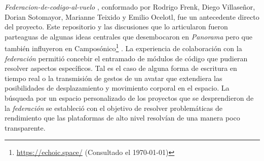 \textit{Federacion-de-codigo-al-vuelo} \citep{en-vivo}, conformado por Rodrigo Frenk, Diego Villaseñor, Dorian Sotomayor, Marianne Teixido y Emilio Ocelotl, fue un antecedente directo del proyecto. Este repositorio y las discusiones que lo articularon fueron parteaguas de algunas ideas centrales que desembocaron en \textit{Panorama} pero que también influyeron en Camposónico\footnote{\url{https://echoic.space/} (Consultado el \today)} \citep{camposonico}. La experiencia de colaboración con la \textit{federación} permitió concebir el entramado de módulos de código que pudieran resolver aspectos específicos. Tal es el caso de alguna forma de escritura en tiempo real o la transmisión de gestos de un avatar que extendiera las posibilidades de desplazamiento y movimiento corporal en el espacio. La búsqueda por un espacio personalizado de los proyectos que se desprendieron de la \textit{federación} se estableció con el objetivo de resolver problemáticas de rendimiento que las plataformas de alto nivel resolvían de una manera poco transparente. 



